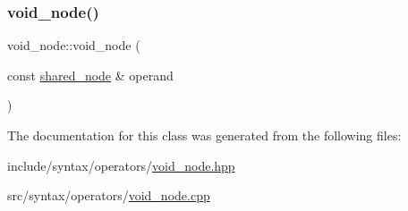 \subsubsection{\texorpdfstring{void\+\_\+node()}{void\_node()}}
{\footnotesize\ttfamily void\+\_\+node\+::void\+\_\+node (\begin{DoxyParamCaption}\item[{const \hyperlink{namespacejawe_a3f307481d921b6cbb50cc8511fc2b544}{shared\+\_\+node} \&}]{operand }\end{DoxyParamCaption})}



The documentation for this class was generated from the following files\+:\begin{DoxyCompactItemize}
\item 
include/syntax/operators/\hyperlink{void__node_8hpp}{void\+\_\+node.\+hpp}\item 
src/syntax/operators/\hyperlink{void__node_8cpp}{void\+\_\+node.\+cpp}\end{DoxyCompactItemize}
